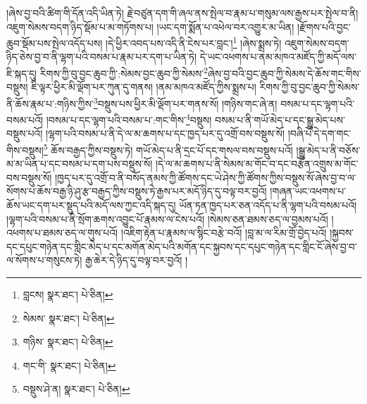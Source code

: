།ཞེས་བྱ་བའི་ཚིག་གི་དོན་འདི་ཡིན་ཏེ། རྗེ་བཙུན་དག་གི་ཞལ་ནས་སྤེལ་བ་རྣམ་པ་གསུམ་ལས་རྒྱས་པར་སྤེལ་བ་ནི། འཇུག་སེམས་བདག་ཉིད་སྡོམ་པ་མ་གཏོགས་པ། །ཡང་དག་སྨོན་པ་འཕེལ་བར་འགྱུར་མ་ཡིན། །རྫོགས་པའི་བྱང་ཆུབ་སྡོམ་པས་སྤེལ་འདོད་པས། །དེ་ཕྱིར་འབད་པས་འདི་ནི་ངེས་པར་བླང་།\footnote{བླངས།  སྣར་ཐང་།  པེ་ཅིན། } །ཞེས་སྨྲས་ཏེ། འཇུག་སེམས་བདག་ཉིད་ཅེས་བྱ་བ་ནི་ལྷག་པའི་བསམ་པ་རྣམ་པར་དག་པ་ཡིན་ཏེ། དེ་ཡང་འཕགས་པ་ནམ་མཁའ་མཛོད་ཀྱི་མདོ་ལས་ཇི་སྐད་དུ། རིགས་ཀྱི་བུ་བྱང་ཆུབ་ཀྱི་:སེམས་བྱང་ཆུབ་ཀྱི་སེམས་\footnote{སེམས་  སྣར་ཐང་།  པེ་ཅིན། }ཞེས་བྱ་བའི་བྱང་ཆུབ་ཀྱི་སེམས་དེ་ཆོས་གང་གིས་བསྡུས། ཇི་ལྟར་ཕྱིར་མི་ལྡོག་པར་ཀུན་དུ་གནས། །ནམ་མཁའ་མཛོད་ཀྱིས་སྨྲས་པ། རིགས་ཀྱི་བུ་བྱང་ཆུབ་ཀྱི་སེམས་ནི་ཆོས་རྣམ་པ་:གཉིས་ཀྱིས་\footnote{གཉིས་  སྣར་ཐང་།  པེ་ཅིན། }བསྡུས་པས་ཕྱིར་མི་ལྡོག་པར་གནས་སོ། །གཉིས་གང་ཞེ་ན། བསམ་པ་དང་ལྷག་པའི་བསམ་པའོ། །བསམ་པ་དང་ལྷག་པའི་བསམ་པ་:གང་གིས་\footnote{གང་གི་  སྣར་ཐང་།  པེ་ཅིན། }བསྡུས། བསམ་པ་ནི་གཡོ་མེད་པ་དང་སྒྱུ་མེད་པས་བསྡུས་པའོ། །ལྷག་པའི་བསམ་པ་ནི་དེ་ལ་མ་ཆགས་པ་དང་ཁྱད་པར་དུ་འགྲོ་བས་བསྡུས་སོ། །བཞི་པོ་དེ་དག་གང་གིས་བསྡུས།\footnote{བསྡུས་ཤེ་ན།  སྣར་ཐང་།  པེ་ཅིན། } ཆོས་བརྒྱད་ཀྱིས་བསྡུས་ཏེ། གཡོ་མེད་པ་ནི་དྲང་པོ་དང་གསལ་བས་བསྡུས་པའོ། །སྒྱུ་མེད་པ་ནི་བཅོས་མ་མ་ཡིན་པ་དང་བསམ་པ་དག་པས་བསྡུས་སོ། །དེ་ལ་མ་ཆགས་པ་ནི་སེམས་མ་གོང་བ་དང་བརྩོན་འགྲུས་མ་གོང་བས་བསྡུས་སོ། །ཁྱད་པར་དུ་འགྲོ་བ་ནི་བསོད་ནམས་ཀྱི་ཚོགས་དང་ཡེ་ཤེས་ཀྱི་ཚོགས་ཀྱིས་བསྡུས་སོ་ཞེས་བྱ་བ་ལ་སོགས་པ་ཆོས་བརྒྱ་ཉི་ཤུ་རྩ་བརྒྱད་ཀྱིས་བསྡུས་ཏེ་རྒྱས་པར་མདོ་ཉིད་དུ་བལྟ་བར་བྱའོ། །གཞན་ཡང་འཕགས་པ་ཆོས་ཡང་དག་པར་སྡུད་པའི་མདོ་ལས་ཀྱང་འདི་སྐད་དུ། ཡོན་ཏན་ཁྱད་པར་ཅན་འདོད་པ་ནི་ལྷག་པའི་བསམ་པའོ། །ལྷག་པའི་བསམ་པ་ནི་སྲོག་ཆགས་འབྱུང་པོ་རྣམས་ལ་ངེས་པའོ། །སེམས་ཅན་ཐམས་ཅད་ལ་བྱམས་པའོ། །འཕགས་པ་ཐམས་ཅད་ལ་གུས་པའོ། །འཇིག་རྟེན་པ་རྣམས་ལ་སྙིང་བརྩེ་བའོ། །བླ་མ་ལ་རིམ་གྲོ་བྱེད་པའོ། །སྐྱབས་དང་དཔུང་གཉེན་དང་གླིང་མེད་པ་དང་མགོན་མེད་པའི་མགོན་དང་སྐྱབས་དང་དཔུང་གཉེན་དང་གླིང་ངོ་ཞེས་བྱ་བ་ལ་སོགས་པ་གསུངས་ཏེ། རྒྱ་ཆེར་དེ་ཉིད་དུ་བལྟ་བར་བྱའོ། །
